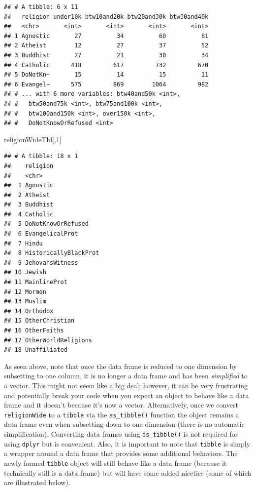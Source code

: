 \documentclass[
]{krantz}
\newenvironment{Shaded}{\begin{snugshade}}{\end{snugshade}}
\newcommand{\DecValTok}[1]{\textcolor[rgb]{0.00,0.00,0.81}{#1}}
\newcommand{\NormalTok}[1]{#1}
\begin{document}
\begin{verbatim}
## # A tibble: 6 x 11
##   religion under10k btw10and20k btw20and30k btw30and40k
##   <chr>       <int>       <int>       <int>       <int>
## 1 Agnostic       27          34          60          81
## 2 Atheist        12          27          37          52
## 3 Buddhist       27          21          30          34
## 4 Catholic      418         617         732         670
## 5 DoNotKn~       15          14          15          11
## 6 Evangel~      575         869        1064         982
## # ... with 6 more variables: btw40and50k <int>,
## #   btw50and75k <int>, btw75and100k <int>,
## #   btw100and150k <int>, over150k <int>,
## #   DoNotKnowOrRefused <int>
\end{verbatim}

\begin{Shaded}
\begin{Highlighting}[]
\NormalTok{religionWideTbl[,}\DecValTok{1}\NormalTok{]}
\end{Highlighting}
\end{Shaded}

\begin{verbatim}
## # A tibble: 18 x 1
##    religion             
##    <chr>                
##  1 Agnostic             
##  2 Atheist              
##  3 Buddhist             
##  4 Catholic             
##  5 DoNotKnowOrRefused   
##  6 EvangelicalProt      
##  7 Hindu                
##  8 HistoricallyBlackProt
##  9 JehovahsWitness      
## 10 Jewish               
## 11 MainlineProt         
## 12 Mormon               
## 13 Muslim               
## 14 Orthodox             
## 15 OtherChristian       
## 16 OtherFaiths          
## 17 OtherWorldReligions  
## 18 Unaffiliated
\end{verbatim}

As seen above, note that once the data frame is reduced to one dimension by subsetting to one column, it is no longer a data frame and has been \emph{simplified} to a vector. This might not seem like a big deal; however, it can be very frustrating and potentially break your code when you expect an object to behave like a data frame and it doesn't because it's now a vector. Alternatively, once we convert \texttt{religionWide} to a \texttt{tibble} via the \texttt{as\_tibble()} function the object remains a data frame even when subsetting down to one dimension (there is no automatic simplification). Converting data frames using \texttt{as\_tibble()} is not required for using \texttt{dplyr} but is convenient. Also, it is important to note that \texttt{tibble} is simply a wrapper around a data frame that provides some additional behaviors. The newly formed \texttt{tibble} object will still behave like a data frame (because it technically still is a data frame) but will have some added niceties (some of which are illustrated below).
\end{document}
